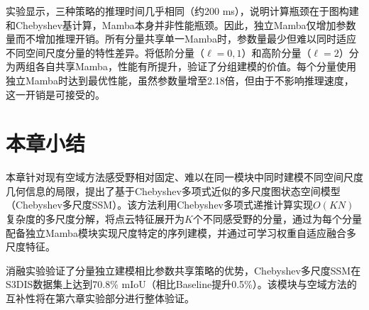实验显示，三种策略的推理时间几乎相同（约200 ms），说明计算瓶颈在于图构建和Chebyshev基计算，Mamba本身并非性能瓶颈。因此，独立Mamba仅增加参数量而不增加推理开销。所有分量共享单一Mamba时，参数量最少但难以同时适应不同空间尺度分量的特性差异。将低阶分量（$\ell=0,1$）和高阶分量（$\ell=2$）分为两组各自共享Mamba，性能有所提升，验证了分组建模的价值。每个分量使用独立Mamba时达到最优性能，虽然参数量增至2.18倍，但由于不影响推理速度，这一开销是可接受的。

\section{本章小结}

本章针对现有空域方法感受野相对固定、难以在同一模块中同时建模不同空间尺度几何信息的局限，提出了基于Chebyshev多项式近似的多尺度图状态空间模型（Chebyshev多尺度SSM）。该方法利用Chebyshev多项式递推计算实现$O(KN)$复杂度的多尺度分解，将点云特征展开为$K$个不同感受野的分量，通过为每个分量配备独立Mamba模块实现尺度特定的序列建模，并通过可学习权重自适应融合多尺度特征。

消融实验验证了分量独立建模相比参数共享策略的优势，Chebyshev多尺度SSM在S3DIS数据集上达到70.8\% mIoU（相比Baseline提升0.5\%）。该模块与空域方法的互补性将在第六章实验部分进行整体验证。
